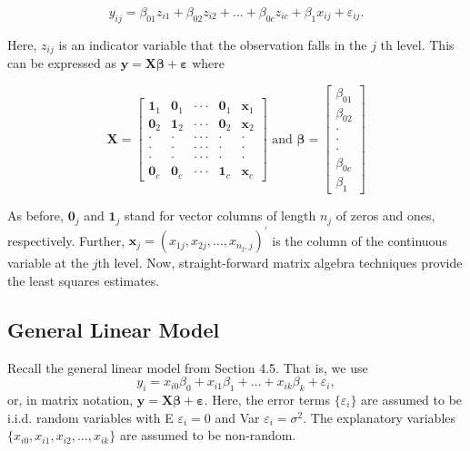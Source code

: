 \begin{center}
\[
y_{ij}=\beta_{01}z_{i1}+\beta_{02}z_{i2}+\ldots+\beta
_{0c}z_{ic}+\beta_1x_{ij}+\varepsilon_{ij}.
\]
\end{center}

\noindent Here, $z_{ij}$ is an indicator variable that the observation falls in the $j$%
th level. This can be expressed as $\mathbf{y}=%
\mathbf{X \boldsymbol \beta + \boldsymbol \varepsilon}$ where

\begin{center}
\[
\mathbf{X}=%
\begin{bmatrix}
\mathbf{1}_1 & \mathbf{0}_1 & \cdot \cdot \cdot  & \mathbf{0}%
_1 & \mathbf{x}_1 \\
\mathbf{0}_2 & \mathbf{1}_2 & \cdot \cdot \cdot  & \mathbf{0}%
_2 & \mathbf{x}_2 \\
\cdot  & \cdot  & \cdot \cdot \cdot  & \cdot  & \cdot  \\
\cdot  & \cdot  & \cdot \cdot \cdot  & \cdot  & \cdot  \\
\cdot  & \cdot  & \cdot \cdot \cdot  & \cdot  & \cdot  \\
\mathbf{0}_{c} & \mathbf{0}_{c} & \cdot \cdot \cdot  & \mathbf{1}_c & \mathbf{x}_{c}%
\end{bmatrix}%
\text{ \ \ \ \ and \ \ \ }\boldsymbol \beta=%
\begin{bmatrix}
\beta_{01} \\
\beta_{02} \\
\cdot  \\
\cdot  \\
\cdot  \\
\beta_{0c} \\
\beta_1%
\end{bmatrix}
\]
\end{center}

\noindent As before, $\mathbf{0}_{j}$ and $\mathbf{1}_j$ stand for
vector columns of length $n_{j}$ of zeros and ones, respectively.
Further,
$\mathbf{x}_{j}=(x_{1j},x_{2j},\ldots,x_{n_{j},j})^{\prime}$ is the
column of the continuous variable at the $j$th level. Now,
straight-forward matrix algebra techniques provide the least squares
estimates.

\subsection{General Linear Model}

Recall the general linear model from Section 4.5. That is, we use
\begin{equation*}
y_i=x_{i0}\beta_0+x_{i1}\beta_1+\ldots+x_{ik}\beta _k+\varepsilon_i,
\end{equation*}
\noindent or, in matrix notation, $ \mathbf{y=X \boldsymbol \beta +
\boldsymbol \varepsilon.}$ Here, the error terms $\{\varepsilon_i\}$
are assumed to be i.i.d. random variables
with E $\varepsilon_i=0$ and Var $\varepsilon_i=\sigma ^{2}$. The explanatory variables $%
\{x_{i0},x_{i1},x_{i2},\ldots,x_{ik}\}$ are assumed to be
non-random.

